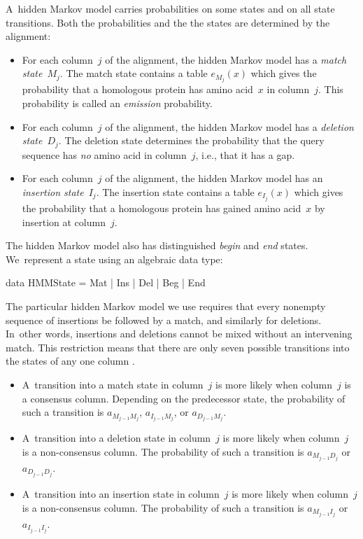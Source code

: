\documentclass[preprint,nonatbib,blockstyle,nocopyrightspace,times]{sigplanconf}
\newcommand\txprobj[3][]{a#1_{#2_{j-1}#3_j}}
\newcommand\txprobjj[3][]{a#1_{#2_{j-1}#3_j}}
\newenvironment{smallverbatim}{\par\small\verbatim}{\endverbatim}
\let\cite\citep
\begin{document}
A~hidden Markov model carries probabilities on some states and on all
state transitions.
Both the probabilities and the
the states are determined by the alignment:
\begin{itemize}
\item
For each column~$j$ of the alignment, the hidden Markov model has a
\emph{match state}~$M_j$.
The match state contains a table $e_{M_j}(x)$ which gives the
 probability that a homologous protein has amino acid~$x$ in
 column~$j$.
This probability is called an \emph{emission} probability.
\item
For each column~$j$ of the alignment, the hidden Markov model has a
\emph{deletion state}~$D_j$.
The deletion state determines the probability that the query sequence
has \emph{no} amino acid  in column~$j$, i.e., that it has a gap.
\item 
For each column~$j$ of the alignment, the hidden Markov model has an
\emph{insertion state}~$I_j$.
The insertion state contains a table $e_{I_j}(x)$ which gives the
probability that a homologous protein has gained amino acid~$x$ by
insertion at column~$j$.
\end{itemize}
The hidden Markov model also has distinguished \emph{begin} and \emph{end} states.
We~represent a state using an algebraic data type:
\begin{smallverbatim}
data HMMState = Mat | Ins | Del | Beg | End
\end{smallverbatim}


The particular hidden Markov model we use requires that every nonempty
sequence of insertions be followed by a match, and similarly for
deletions.
In~other words, insertions and deletions cannot be mixed without an
intervening match.
This restriction means that there are only seven possible transitions
into the states of any one column \cite{Eddy:1998ut}. 
\begin{itemize} 
\item
A~transition into a match state in
column~$j$ is more likely when column~$j$ is a consensus column.
Depending on the predecessor state, 
the probability of such a transition is 
$\txprobj M M$, $\txprobj I M$, or $\txprobj D M$.
\item
A~transition into a deletion state in
 column~$j$ is more likely when column~$j$ is a non-consensus column.
The probability of such a transition is 
$\txprobj M D$ or $\txprobj D D$.
\item
A~transition into an insertion state in
 column~$j$ is more likely when column~$j$ is a non-consensus column.
The probability of such a transition is 
$\txprobjj M I$ or $\txprobjj I I$.
\end{itemize}
\end{document}
